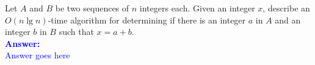 \item{}
Let $A$ and $B$ be two sequences of $n$ integers each. Given an integer $x$,
describe an \\$O(n\lg n)$-time algorithm for determining if there is an integer
$a$ in $A$ and an integer $b$ in $B$ such that $x=a+b$.\\[12pt]
\ifanswers
\textcolor{blue}{
\textbf{Answer:}\\[6pt]
Answer goes here
}
\newpage
\fi
